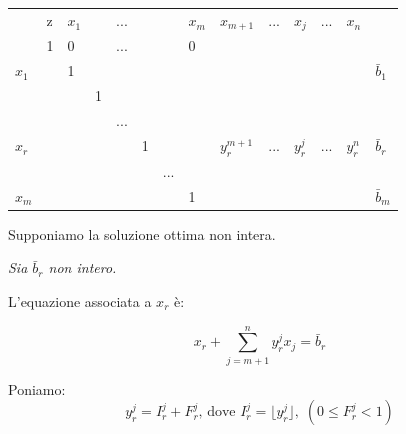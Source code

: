 \begin{table}[h]
	\centering
	\begin{tabular}{llllllllllllll}
		&                       z & $x_{1}$ &    & ... &     &      & $x_{m}$ & $x_{m+1}$     & ... & $x_{j}$     & ... & $x_{n}$     & \\ \cline{2-14}
		& \multicolumn{1}{|l|}{1} & 0       &    & ... &     &      & 0       &               &     &             &     &             & \multicolumn{1}{|l|}{} \\ \cline{2-14}
		$x_{1}$ & \multicolumn{1}{|l|}{}  & 1       &    &     &     &      &         &               &     &             &     &	           & \multicolumn{1}{|l|}{$\bar{b}_{1}$} \\
		& \multicolumn{1}{|l|}{}  &         & 1  &     &     &      &         &               &     &             &     &             & \multicolumn{1}{|l|}{} \\
		& \multicolumn{1}{|l|}{}  &         &    & ... &     &      &         &               &     &             &     &             & \multicolumn{1}{|l|}{} \\
		$x_{r}$ & \multicolumn{1}{|l|}{}  &         &    &     & 1   &      &         & $y_{r}^{m+1}$ & ... & $y_{r}^{j}$ & ... & $y_{r}^{n}$ & \multicolumn{1}{|l|}{$\bar{b}_{r}$} \\
		& \multicolumn{1}{|l|}{}  &         &    &     &     & ...  &         &               &     &             &     &             & \multicolumn{1}{|l|}{} \\
		$x_{m}$ & \multicolumn{1}{|l|}{}  &         &    &     &     &      & 1       &               &     &             &     &             & \multicolumn{1}{|l|}{$\bar{b}_{m}$} \\ \cline{2-14}
	\end{tabular}
\end{table}

Supponiamo la soluzione ottima non intera.\newline

\emph{Sia $\bar{b}_{r}$ non intero.}
\newline

L'equazione associata a $x_{r}$ è:

\begin{equation}\label{eq:2.20}
x_{r} + \sum_{j=m+1}^{n} y_{r}^{j} x_{j} = \bar{b}_{r}
\end{equation}

Poniamo:
\begin{equation}
y_{r}^{j} = I_{r}^{j} + F_{r}^{j}\text{, dove }I_{r}^{j} = \lfloor y_{r}^{j} \rfloor,\;(0 \le F_{r}^{j} < 1)
\end{equation}

